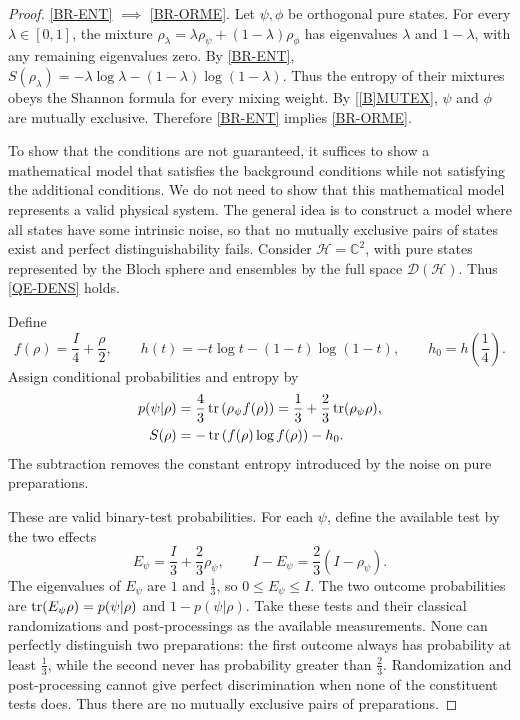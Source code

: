 \documentclass{techbrief}
\begin{document}
\begin{proof}
	\ref{BR-ENT} $\implies$ \ref{BR-ORME}.
	Let $\psi,\phi$ be orthogonal pure states. For every $\lambda\in[0,1]$, the mixture $\rho_\lambda=\lambda\rho_\psi+(1-\lambda)\rho_\phi$ has eigenvalues $\lambda$ and $1-\lambda$, with any remaining eigenvalues zero. By \ref{BR-ENT}, $S(\rho_\lambda) = - \lambda \log\lambda - (1-\lambda) \log(1-\lambda)$. Thus the entropy of their mixtures obeys the Shannon formula for every mixing weight. By \ref{[B]MUTEX}, $\psi$ and $\phi$ are mutually exclusive. Therefore \ref{BR-ENT} implies \ref{BR-ORME}.
	
	To show that the conditions are not guaranteed, it suffices to show a mathematical model that satisfies the background conditions while not satisfying the additional conditions. We do not need to show that this mathematical model represents a valid physical system. The general idea is to construct a model where all states have some intrinsic noise, so that no mutually exclusive pairs of states exist and perfect distinguishability fails. Consider
	$\mathcal{H}=\mathbb{C}^2$, with pure states represented by the
	Bloch sphere and ensembles by the full space
	$\mathcal{D}(\mathcal{H})$. Thus \ref{QE-DENS} holds.
	
	Define
	\begin{equation*}
		f(\rho)=\frac{I}{4}+\frac{\rho}{2},
		\qquad
		h(t)=-t\log t-(1-t)\log(1-t),
		\qquad
		h_0=h\left(\frac{1}{4}\right).
	\end{equation*}
	Assign conditional probabilities and entropy by
	\begin{equation*}
		\begin{aligned}
			p(\psi|\rho)
			&=\frac{4}{3}\operatorname{tr}\left(\rho_\psi f(\rho)\right)
			=\frac{1}{3}+\frac{2}{3}\operatorname{tr}(\rho_\psi\rho),\\
			S(\rho)
			&=-\operatorname{tr}\left(f(\rho)\log f(\rho)\right)-h_0.
		\end{aligned}
	\end{equation*}
	The subtraction removes the constant entropy introduced by
	the noise on pure preparations.
	
	These are valid binary-test probabilities. For each $\psi$,
	define the available test by the two effects
	\begin{equation*}
		E_\psi=\frac{I}{3}+\frac{2}{3}\rho_\psi,
		\qquad
		I-E_\psi=\frac{2}{3}(I-\rho_\psi).
	\end{equation*}
	The eigenvalues of $E_\psi$ are $1$ and $\frac{1}{3}$, so
	$0\leq E_\psi\leq I$. The two outcome probabilities are
	$\operatorname{tr}(E_\psi\rho)=p(\psi|\rho)$ and $1-p(\psi|\rho)$.
	Take these tests and their classical randomizations and
	post-processings as the available measurements. None can
	perfectly distinguish two preparations: the first outcome
	always has probability at least $\frac{1}{3}$, while the
	second never has probability greater than $\frac{2}{3}$.
	Randomization and post-processing cannot give perfect
	discrimination when none of the constituent tests does.
	Thus there are no mutually exclusive pairs of preparations.
	

\end{proof}
\end{document}
